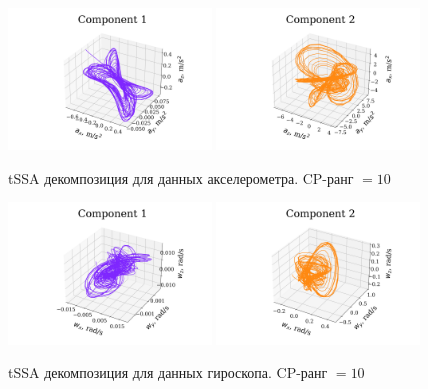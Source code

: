			\begin{figure}[h]
				\centering
				\includegraphics[width=0.48\textwidth, 	keepaspectratio]{../experiments/motion_1/tssa/figs/decomposition/cpd_rank_15/acceler_1.png}
				\includegraphics[width=0.48\textwidth, keepaspectratio]{../experiments/motion_1/tssa/figs/decomposition/cpd_rank_15/acceler_2.png}
			\caption{tSSA декомпозиция для данных акселерометра. CP-ранг $ = 10 $}\label{fig:accel_decomp_tssa}
			\end{figure}
			
			\begin{figure}[h]
				\centering
				\includegraphics[width=0.48\textwidth, 	keepaspectratio]{../experiments/motion_1/tssa/figs/decomposition/cpd_rank_15/gyro_1.png}
				\includegraphics[width=0.48\textwidth, keepaspectratio]{../experiments/motion_1/tssa/figs/decomposition/cpd_rank_15/gyro_2.png}
				\caption{tSSA декомпозиция для данных гироскопа. CP-ранг $ = 10 $}\label{fig:gyro_decomp_tssa}
			\end{figure}
			
